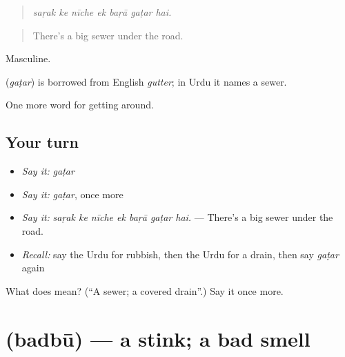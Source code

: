 \begin{quote}
      
\end{quote}

\begin{quote}
\emph{saṛak ke nīche ek baṛā gaṭar hai.}
\end{quote}

\begin{quote}
There's a big sewer under the road.
\end{quote}

Masculine.

\begin{cousinweb}
\textbf{} (\emph{gaṭar}) is borrowed from English \emph{gutter}; in Urdu it names a sewer.
\end{cousinweb}

\begin{grammarlens}[title={What you've built}]
One more word for getting around.
\end{grammarlens}

\subsection*{Your turn}
\begin{itemize}
\raggedright
  \item \emph{Say it:} \emph{gaṭar}
  \item \emph{Say it:} \emph{gaṭar}, once more
  \item \emph{Say it:} \emph{saṛak ke nīche ek baṛā gaṭar hai.} — There's a big sewer under the road.
  \item \emph{Recall:} say the Urdu for rubbish, then the Urdu for a drain, then say \emph{gaṭar} again
\end{itemize}

\begin{tcolorbox}[breakable,colback=teal!4,colframe=teal!35!black,title={Before you move on}]
What does  mean? (\textquotedblleft{}A sewer; a covered drain\textquotedblright{}.) Say it once more.
\end{tcolorbox}
\section[\texorpdfstring{\ur{بدبو} (badbū)}{بدبو (badbū)}]{ (badbū) — a stink; a bad smell}

\label{lesson:UR-C416-badbu}



